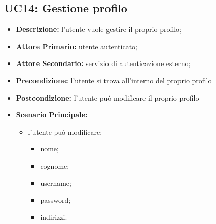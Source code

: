 \subsection{UC14: Gestione profilo}
\label{sec:UC14}
\begin{itemize}
    \item \textbf{Descrizione:} l'utente vuole gestire il proprio profilo;
    \item \textbf{Attore Primario:} utente autenticato;
    \item \textbf{Attore Secondario:} servizio di autenticazione esterno;
    \item \textbf{Precondizione:} l'utente si trova all'interno del proprio profilo
    \item \textbf{Postcondizione:} l'utente può modificare il proprio profilo
    \item \textbf{Scenario Principale:}
          \begin{itemize}
              \item  l'utente può modificare:
                    \begin{itemize}
                        \item nome;
                        \item cognome;
                        \item username;
                        \item password;
                        \item indirizzi.
                    \end{itemize}
          \end{itemize}
\end{itemize}
